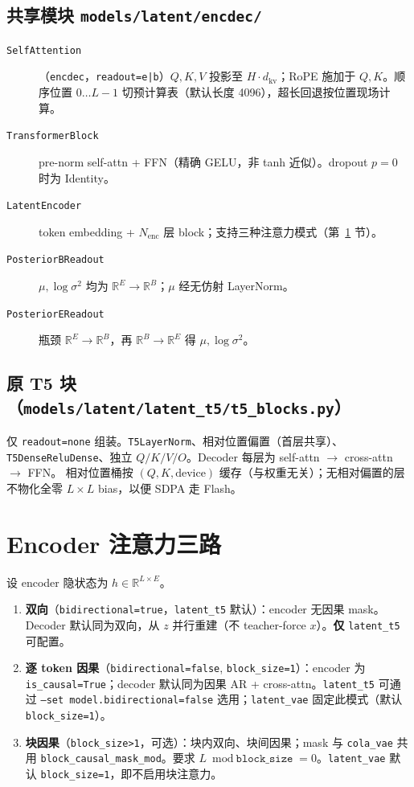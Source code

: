 \documentclass[UTF8,a4paper,11pt]{ctexart}
\begin{document}
\subsection{共享模块 \texttt{models/latent/encdec/}}

\begin{description}
  \item[\texttt{SelfAttention}]（\texttt{encdec}，\texttt{readout=e|b}）$Q,K,V$ 投影至 $H \cdot d_{\mathrm{kv}}$；RoPE 施加于 $Q,K$。顺序位置 $0{\ldots}L{-}1$ 切预计算表（默认长度 4096），超长回退按位置现场计算。
  \item[\texttt{TransformerBlock}] pre-norm self-attn + FFN（精确 GELU，非 tanh 近似）。dropout $p{=}0$ 时为 Identity。
  \item[\texttt{LatentEncoder}] token embedding + $N_{\mathrm{enc}}$ 层 block；支持三种注意力模式（第~\ref{sec:attn} 节）。
  \item[\texttt{PosteriorBReadout}] $\mu,\log\sigma^2$ 均为 $\mathbb{R}^{E}\!\to\!\mathbb{R}^{B}$；$\mu$ 经无仿射 LayerNorm。
  \item[\texttt{PosteriorEReadout}] 瓶颈 $\mathbb{R}^{E}\!\to\!\mathbb{R}^{B}$，再 $\mathbb{R}^{B}\!\to\!\mathbb{R}^{E}$ 得 $\mu,\log\sigma^2$。
\end{description}

\subsection{原 T5 块（\texttt{models/latent/latent\_t5/t5\_blocks.py}）}

仅 \texttt{readout=none} 组装。\texttt{T5LayerNorm}、相对位置偏置（首层共享）、\texttt{T5DenseReluDense}、独立 $Q/K/V/O$。Decoder 每层为 self-attn $\to$ cross-attn $\to$ FFN。
相对位置桶按 $(Q,K,\mathrm{device})$ 缓存（与权重无关）；无相对偏置的层不物化全零 $L{\times}L$ bias，以便 SDPA 走 Flash。

\section{Encoder 注意力三路}
\label{sec:attn}

设 encoder 隐状态为 $h \in \mathbb{R}^{L \times E}$。

\begin{enumerate}
  \item \textbf{双向}（\texttt{bidirectional=true}，\texttt{latent\_t5} 默认）：encoder 无因果 mask。Decoder 默认同为双向，从 $z$ 并行重建（不 teacher-force $x$）。\textbf{仅} \texttt{latent\_t5} 可配置。
  \item \textbf{逐 token 因果}（\texttt{bidirectional=false}, \texttt{block\_size=1}）：encoder 为 \texttt{is\_causal=True}；decoder 默认同为因果 AR + cross-attn。\texttt{latent\_t5} 可通过 \texttt{--set model.bidirectional=false} 选用；\texttt{latent\_vae} 固定此模式（默认 \texttt{block\_size=1}）。
  \item \textbf{块因果}（\texttt{block\_size>1}，可选）：块内双向、块间因果；mask 与 \texttt{cola\_vae} 共用 \texttt{block\_causal\_mask\_mod}。要求 $L \bmod \texttt{block\_size} = 0$。\texttt{latent\_vae} 默认 \texttt{block\_size=1}，即不启用块注意力。
\end{enumerate}
\end{document}
